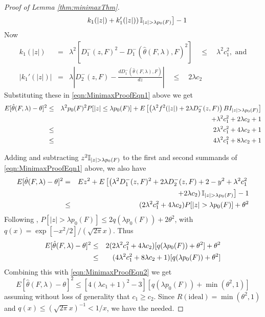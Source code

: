 \begin{proof}[Proof of Lemma \ref{thm:minimaxThm}]
\begin{eqnarray}
&& \left.\left. k_1(|z|) + k_1'(|z|) \right) {\mathbb{I}}_{|z| > \lambda p_0(F)} \right] - 1
\end{eqnarray}
%
Now
%
\begin{eqnarray*}
k_1(|z|) &=& \lambda^2 \left[ D^-_1(z,F)^2 - D^-_1(\hat\theta(F,\lambda), F)^2 \right] \quad \leq \quad \lambda^2 c_1^2, \text{ and}\\
| k_1'(|z|) | &=& \lambda \left| D^-_2(z,F) - \frac{d D^-_1(\hat\theta(F,\lambda), F)}{dz} \right| \quad \leq \quad 2\lambda c_2
\end{eqnarray*}
%
Substituting these in \ref{eqn:MinimaxProofEqn1} above we get
%
\begin{eqnarray}\label{eqn:MinimaxProofEqn2}
E [ \hat\theta(F,\lambda) - \theta]^2 & \leq & \lambda^2 p_0(F)^2 P [|z| \leq \lambda p_0(F)] + E \left[ \left(\lambda^2 f^2(|z|) + 2 \lambda D^-_2(z, F) \right) BI_{|z| > \lambda p_0(F)} \right] \notag\\
&& + \lambda^2 c_1^2 + 2\lambda c_2 + 1 \notag\\
& \leq & 2\lambda^2 c_1^2 + 4 \lambda c_2 + 1 \notag\\
& \leq & 4\lambda^2 c_1^2 + 8 \lambda c_2 + 1
\end{eqnarray}
%

Adding and subtracting $z^2 {\mathbb{I}}_{|z| > \lambda p_0(F)}$ to the first and second summands of \ref{eqn:MinimaxProofEqn1} above, we also have
%
\begin{eqnarray}
E [ \hat\theta(F,\lambda) - \theta]^2 &=& Ez^2 + E \left[ \left(\lambda^2 D^-_1(z,F)^2 + 2 \lambda D^-_2(z,F) + 2 - y^2 + \lambda^2 c_1^2 \right.\right. \notag\\
& & \left.\left. + 2\lambda c_2 \right) {\mathbb{I}}_{|z| > \lambda p_0(F)} \right] - 1\notag\\
& \leq & (2 \lambda^2 c_1^2 + 4 \lambda c_2) P [ |z| > \lambda p_0(F) ] + \theta^2
\end{eqnarray}
%
Following \cite{Zou06}, $P[|z| > \lambda p_0(F)] \leq 2q (\lambda p_0(F)) + 2\theta^2$, with $q(x) = \exp[-x^2/2]/(\sqrt{2\pi} x)$. Thus
%
\begin{eqnarray}
E [ \hat\theta(F,\lambda) - \theta]^2 &\leq & 2 (2 \lambda^2 c_1^2 + 4 \lambda c_2) [q (\lambda p_0(F)) + \theta^2] + \theta^2\notag\\
& \leq & (4\lambda^2 c_1^2 + 8 \lambda c_2 + 1)[q (\lambda p_0(F)) + \theta^2] 
\end{eqnarray}
%
Combining this with \ref{eqn:MinimaxProofEqn2} we get
%
\begin{equation}
E [ \hat\theta(F,\lambda) - \theta]^2 \leq [ 4(\lambda c_1 + 1)^2 - 3][q (\lambda p_0(F)) + \min(\theta^2,1)] 
\end{equation}
%
assuming without loss of generality that $c_1 \geq c_2$. Since $R(\text{ideal}) = \min(\theta^2,1)$ and $q(x) \leq (\sqrt{2\pi} x)^{-1} < 1/x$, we have the needed.
\end{proof}
